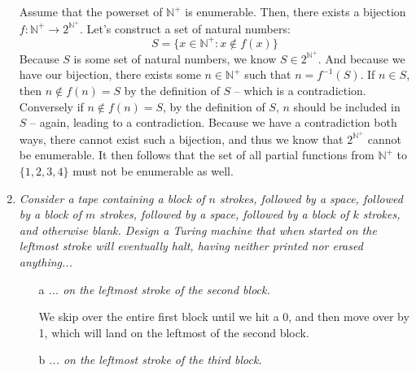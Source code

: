 \begin{enumerate}
    Assume that the powerset of $\mathds{N}^+$ is enumerable. Then, there exists a bijection $f: \mathds{N^+} \rightarrow 2^{\mathds{N}^+}$. Let's construct a set of natural numbers:
    $$S = \{x \in \mathds{N}^+ : x \not \in f(x) \}$$
    Because $S$ is some set of natural numbers, we know $S \in 2^{\mathds{N}^+}$. And because we have our bijection, there exists some $n \in \mathds{N}^+$ such that $n = f^{-1}(S)$. If $n \in S$, then $n \not \in f(n)=S$ by the definition of $S$ -- which is a contradiction. Conversely if $n \not \in f(n)=S$, by the definition of $S$, $n$ should be included in $S$ -- again, leading to a contradiction. Because we have a contradiction both ways, there cannot exist such a bijection, and thus we know that $2^{\mathds{N}^+}$ cannot be enumerable. It then follows that the set of all partial functions from $\mathds{N}^+$ to $\{1,2,3,4\}$ must not be enumerable as well.
    
  \item 
    {\it
      Consider a tape containing a block of $n$ strokes, followed by a space, followed by a block of $m$ strokes, followed by a space, followed by a block of $k$ strokes, and otherwise blank. Design a Turing machine that when started on the leftmost stroke will eventually halt, having neither printed nor erased anything...
    }
    \begin{itemize}
      \item [a] {\it ... on the leftmost stroke of the second block.}\\

        \begin{figure}[H]
        \end{figure}

        We skip over the entire first block until we hit a 0, and then move over by 1, which will land on the leftmost of the second block.

      \item [b] {\it ... on the leftmost stroke of the third block.}\\


\end{itemize}
\end{enumerate}
